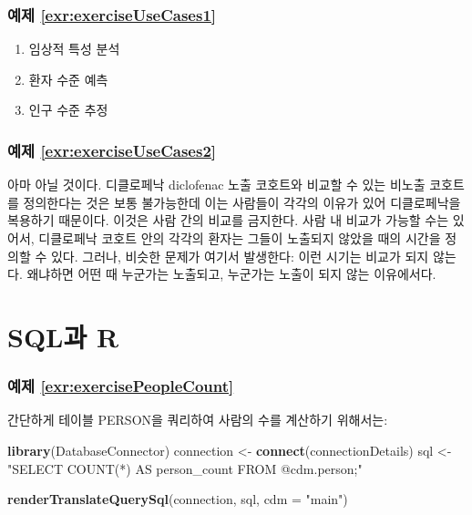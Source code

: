\documentclass[10.5pt]{book}
\newenvironment{Shaded}{\begin{snugshade}}{\end{snugshade}}
\newcommand{\KeywordTok}[1]{\textcolor[rgb]{0.13,0.29,0.53}{\textbf{#1}}}
\newcommand{\DataTypeTok}[1]{\textcolor[rgb]{0.13,0.29,0.53}{#1}}
\newcommand{\StringTok}[1]{\textcolor[rgb]{0.31,0.60,0.02}{#1}}
\newcommand{\NormalTok}[1]{#1}
\theoremstyle{definition}
\theoremstyle{definition}
\theoremstyle{definition}
\theoremstyle{remark}
\begin{document}
\subsubsection*{예제
\ref{exr:exerciseUseCases1}}\label{-refexrexerciseusecases1}

\begin{enumerate}
\def\labelenumi{\arabic{enumi}.}
\item
  임상적 특성 분석
\item
  환자 수준 예측
\item
  인구 수준 추정
\end{enumerate}

\subsubsection*{예제
\ref{exr:exerciseUseCases2}}\label{-refexrexerciseusecases2}

아마 아닐 것이다. 디클로페낙 diclofenac 노출 코호트와 비교할 수 있는
비노출 코호트를 정의한다는 것은 보통 불가능한데 이는 사람들이 각각의
이유가 있어 디클로페낙을 복용하기 때문이다. 이것은 사람 간의 비교를
금지한다. 사람 내 비교가 가능할 수는 있어서, 디클로페낙 코호트 안의
각각의 환자는 그들이 노출되지 않았을 때의 시간을 정의할 수 있다. 그러나,
비슷한 문제가 여기서 발생한다: 이런 시기는 비교가 되지 않는다. 왜냐하면
어떤 때 누군가는 노출되고, 누군가는 노출이 되지 않는 이유에서다.

\section{SQL과 R}\label{SqlAndRanswers}

\subsubsection*{예제
\ref{exr:exercisePeopleCount}}\label{-refexrexercisepeoplecount}

간단하게 테이블 PERSON을 쿼리하여 사람의 수를 계산하기 위해서는:

\begin{Shaded}
\begin{Highlighting}[]
\KeywordTok{library}\NormalTok{(DatabaseConnector)}
\NormalTok{connection <-}\StringTok{ }\KeywordTok{connect}\NormalTok{(connectionDetails)}
\NormalTok{sql <-}\StringTok{ "SELECT COUNT(*) AS person_count}
\StringTok{FROM @cdm.person;"}

\KeywordTok{renderTranslateQuerySql}\NormalTok{(connection, sql, }\DataTypeTok{cdm =} \StringTok{"main"}\NormalTok{)}
\end{Highlighting}
\end{Shaded}
\end{document}
